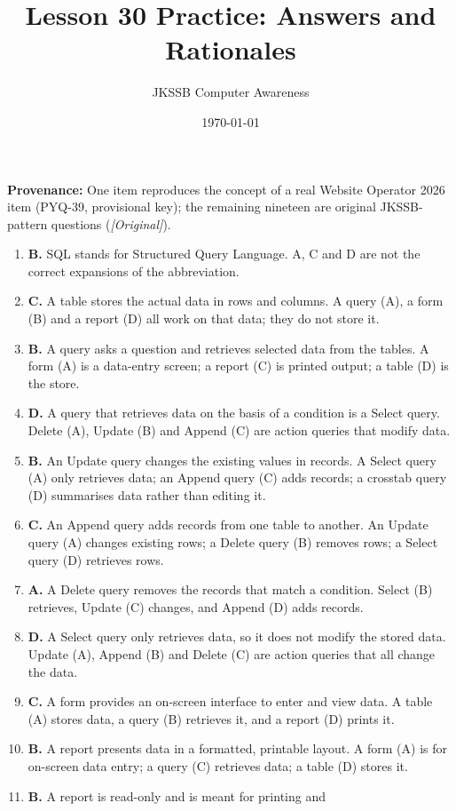 \documentclass[11pt]{article}
\title{Lesson 30 Practice: Answers and Rationales}
\author{JKSSB Computer Awareness}
\date{\today}
\begin{document}
\maketitle
\noindent\textbf{Provenance:} One item reproduces the concept of a real
Website Operator 2026 item (PYQ-39, provisional key); the remaining nineteen
are original JKSSB-pattern questions (\textit{[Original]}).
\begin{enumerate}[label=\textbf{Q\arabic*.}, leftmargin=*]
\item \textbf{B.} SQL stands for Structured Query Language. A, C and D are
  not the correct expansions of the abbreviation.
\item \textbf{C.} A table stores the actual data in rows and columns. A
  query (A), a form (B) and a report (D) all work on that data; they do not
  store it.
\item \textbf{B.} A query asks a question and retrieves selected data from
  the tables. A form (A) is a data-entry screen; a report (C) is printed
  output; a table (D) is the store.
\item \textbf{D.} A query that retrieves data on the basis of a condition is
  a Select query. Delete (A), Update (B) and Append (C) are action queries
  that modify data.
\item \textbf{B.} An Update query changes the existing values in records. A
  Select query (A) only retrieves data; an Append query (C) adds records; a
  crosstab query (D) summarises data rather than editing it.
\item \textbf{C.} An Append query adds records from one table to another. An
  Update query (A) changes existing rows; a Delete query (B) removes rows; a
  Select query (D) retrieves rows.
\item \textbf{A.} A Delete query removes the records that match a condition.
  Select (B) retrieves, Update (C) changes, and Append (D) adds records.
\item \textbf{D.} A Select query only retrieves data, so it does not modify
  the stored data. Update (A), Append (B) and Delete (C) are action queries
  that all change the data.
\item \textbf{C.} A form provides an on-screen interface to enter and view
  data. A table (A) stores data, a query (B) retrieves it, and a report (D)
  prints it.
\item \textbf{B.} A report presents data in a formatted, printable layout. A
  form (A) is for on-screen data entry; a query (C) retrieves data; a table
  (D) stores it.
\item \textbf{B.} A report is read-only and is meant for printing and

\end{enumerate}
\end{document}
